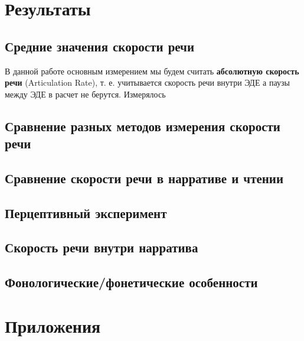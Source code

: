 \section{Результаты}
\subsection{Средние значения скорости речи}
\noindent В данной работе основным измерением мы будем считать \textbf{абсолютную скорость речи} (Articulation Rate), т. е. учитывается скорость речи внутри ЭДЕ а паузы между ЭДЕ в расчет не берутся. Измерялось 
\subsection{Сравнение разных методов измерения скорости речи}
\subsection{Сравнение скорости речи в нарративе и чтении}
\subsection{Перцептивный эксперимент}
\subsection{Скорость речи внутри нарратива}
\subsection{Фонологические/фонетические особенности}
\pagebreak
\footnotesize


\normalsize
\section{Приложения}
